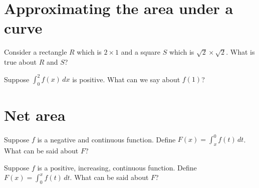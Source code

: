 \documentclass{ximera}
\begin{document}
\clearpage

\section{Approximating the area under a curve}

\begin{problem}
  Consider a rectangle $R$ which is $2 \times 1$ and a square $S$
  which is $\sqrt{2} \times \sqrt{2}$.  What is true about $R$ and
  $S$?
  \begin{multipleChoice}
  \end{multipleChoice}
\end{problem}

\begin{problem}
  Suppose $\int_0^2 f(x) \, dx$ is positive.  What can we say about $f(1)$?
  \begin{multipleChoice}
  \end{multipleChoice}
\end{problem}

\clearpage

\section{Net area}

\begin{problem}
  Suppose $f$ is a negative and continuous function.  Define $F(x) = \int_x^0 f(t) \, dt$.  What can be said about $F$?
  \begin{multipleChoice}
  \end{multipleChoice}
\end{problem}

\begin{problem}
  Suppose $f$ is a positive, increasing, continuous function.  Define $F(x) = \int_0^x f(t) \, dt$.  What can be said about $F$?
  \begin{multipleChoice}
  \end{multipleChoice}
\end{problem}
\end{document}
